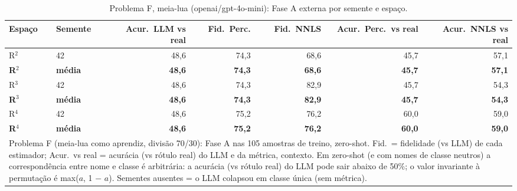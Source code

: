 \begin{table}[htbp]
\centering
\small
\caption{Problema F, meia-lua (openai/gpt-4o-mini): Fase A externa por semente e espaço.}
\label{tab:bloco2_F_meialua_faseA_R2_R3_R4_gpt4mini}
\begin{tabular}{llrrrrr}
\toprule
Espaço & Semente & Acur.\ LLM vs real & Fid.\ Perc. & Fid.\ NNLS & Acur.\ Perc.\ vs real & Acur.\ NNLS vs real \\
\midrule
R$^2$ & 42 & 48,6 & 74,3 & 68,6 & 45,7 & 57,1 \\
\textbf{R$^2$} & \textbf{média} & \textbf{48,6} & \textbf{74,3} & \textbf{68,6} & \textbf{45,7} & \textbf{57,1} \\
\midrule
R$^3$ & 42 & 48,6 & 74,3 & 82,9 & 45,7 & 54,3 \\
\textbf{R$^3$} & \textbf{média} & \textbf{48,6} & \textbf{74,3} & \textbf{82,9} & \textbf{45,7} & \textbf{54,3} \\
\midrule
R$^4$ & 42 & 48,6 & 75,2 & 76,2 & 60,0 & 59,0 \\
\textbf{R$^4$} & \textbf{média} & \textbf{48,6} & \textbf{75,2} & \textbf{76,2} & \textbf{60,0} & \textbf{59,0} \\
\bottomrule
\multicolumn{7}{p{0.95\linewidth}}{\footnotesize Problema F (meia-lua como aprendiz, divisão 70/30): Fase A nas 105 amostras de treino, zero-shot. Fid.\ = fidelidade (vs LLM) de cada estimador; Acur.\ vs real = acurácia (vs rótulo real) do LLM e da métrica, contexto. Em zero-shot (e com nomes de classe neutros) a correspondência entre nome e classe é arbitrária: a acurácia (vs rótulo real) do LLM pode sair abaixo de 50\%; o valor invariante à permutação é max($a$, 1 $-$ $a$). Sementes ausentes = o LLM colapsou em classe única (sem métrica).} \\
\end{tabular}
\end{table}
